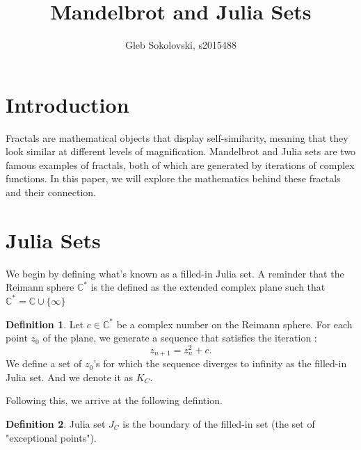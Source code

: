 \documentclass[a4paper,11pt]{article}
\title{Mandelbrot and Julia Sets}
\author{Gleb Sokolovski, s2015488}
\theoremstyle{definition}
\newtheorem{defn}{Definition}[section] %
\numberwithin{equation}{section} %
\begin{document}
\maketitle

\section{Introduction}

Fractals are mathematical objects that display self-similarity, meaning that they look similar at different levels of magnification. Mandelbrot and Julia sets are two famous examples of fractals, both of which are generated by iterations of complex functions. In this paper, we will explore the mathematics behind these fractals and their connection.

\section{Julia Sets}

We begin by defining what's known as a filled-in Julia set. A reminder that the Reimann sphere $\mathbb{C}^*$ is the defined as the extended complex plane such that $\mathbb{C}^* = \mathbb{C} \cup \{ \infty \}$

\begin{defn}
    Let $c \in \mathbb{C}^{*}$ be a complex number on the Reimann sphere. For each point $z_0$ of the plane, we generate a sequence that satisfies the iteration :
    \begin{equation}
        z_{n+1} = z_n^2 + c.\label{eq:1}
    \end{equation}
    We define a set of $z_0$'s for which the sequence diverges to infinity as the filled-in Julia set. And we denote it as $K_C$.
\end{defn}


Following this, we arrive at the following defintion.

\begin{defn}
     Julia set $J_C$ is the boundary of the filled-in set (the set of "exceptional points").
\end{defn}
\end{document}

